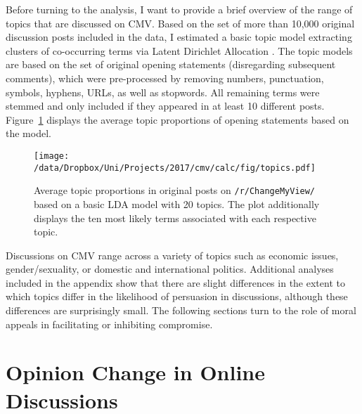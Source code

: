 
Before turning to the analysis, I want to provide a brief overview of the range of topics that are discussed on CMV. Based on the set of more than 10,000 original discussion posts included in the data, I estimated a basic topic model extracting clusters of co-occurring terms via Latent Dirichlet Allocation \citet{blei2003latent}. The topic models are based on the set of original opening statements (disregarding subsequent comments), which were pre-processed by removing numbers, punctuation, symbols, hyphens, URLs, as well as stopwords. All remaining terms were stemmed and only included if they appeared in at least 10 different posts. Figure~\ref{fig:lda} displays the average topic proportions of opening statements based on the model.

\begin{figure}[ht]
\centering
\texttt{[image: /data/Dropbox/Uni/Projects/2017/cmv/calc/fig/topics.pdf]}
\caption[Average topic proportions in original posts on \texttt{/r/ChangeMyView/}]{Average topic proportions in original posts on \texttt{/r/ChangeMyView/} based on a basic LDA model with 20 topics. The plot additionally displays the ten most likely terms associated with each respective topic.}\label{fig:lda}
\end{figure}

Discussions on CMV range across a variety of topics such as economic issues, gender/sexuality, or domestic and international politics. Additional analyses included in the appendix show that there are slight differences in the extent to which topics differ in the likelihood of persuasion in discussions, although these differences are surprisingly small. The following sections turn to the role of moral appeals in facilitating or inhibiting compromise.



\section{Opinion Change in Online Discussions}

